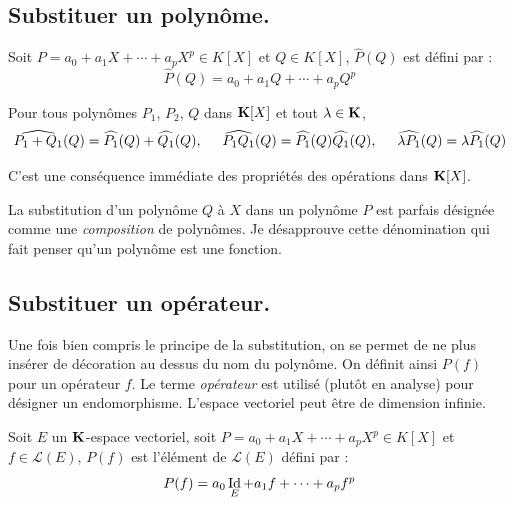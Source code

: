 \subsection{Substituer un polynôme.}
\begin{defi}
 Soit $P = a_0+a_1X + \cdots +a_pX^p \in K[X]$  et $Q \in K[X]$, $\widehat{P}(Q)$ est défini par :
\begin{displaymath}
 \widehat{P}(Q) = a_0+a_1Q + \cdots +a_pQ^p
\end{displaymath}
\end{defi}
\begin{prop}
 Pour tous polynômes $P_1$, $P_2$, $Q$ dans $\mathbf{K}[X]$ et tout $\lambda \in \mathbf{K}$,
 \begin{displaymath}
\widehat{P_1 + Q_1}(Q) =  \widehat{P_1}(Q) + \widehat{Q_1}(Q), \hspace{0.5cm}
\widehat{P_1  Q_1}(Q) =  \widehat{P_1}(Q)  \widehat{Q_1}(Q), \hspace{0.5cm}
\widehat{\lambda P_1}(Q) =  \lambda \widehat{P_1}(Q)
 \end{displaymath}
\end{prop}
\begin{demo}
  C'est une conséquence immédiate des propriétés des opérations dans $\mathbf{K}[X]$.
\end{demo}
\begin{rem}
 La substitution d'un polynôme $Q$ à $X$ dans un polynôme $P$ est parfais désignée comme une \emph{composition} de polynômes. Je désapprouve cette dénomination qui fait penser qu'un polynôme est une fonction. 
\end{rem}

\subsection{Substituer un opérateur.}
Une fois bien compris le principe de la substitution, on se permet de ne plus insérer de décoration au dessus du nom du polynôme. On définit ainsi $P(f)$ pour un opérateur $f$. Le terme \emph{opérateur} est utilisé (plutôt en analyse) pour désigner un endomorphisme. L'espace vectoriel peut être de dimension infinie.
\begin{defi}
 Soit $E$ un $\mathbf{K}$-espace vectoriel, soit $P = a_0+a_1X + \cdots +a_pX^p \in K[X]$  et $f \in \mathcal L(E)$, $P(f)$ est l'élément de $\mathcal L(E)$ défini par :
\begin{displaymath}
 P(f) = a_0\mathop{\mathrm{Id}}_E+a_1f + \cdots +a_pf^p
\end{displaymath}
\end{defi}

